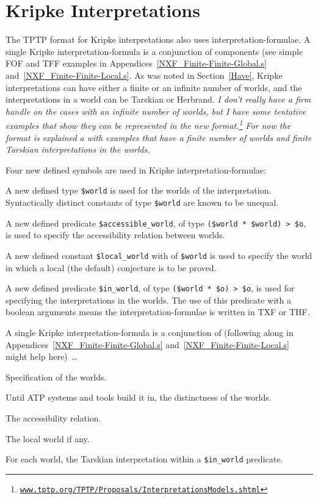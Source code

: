 \documentclass{easychair}
\newenvironment{packed_itemize}{
\vspace*{-0.3em}
\begin{itemize}
\setlength{\partopsep}{0pt}
\setlength{\itemsep}{1pt}
\setlength{\parskip}{0pt}
\setlength{\parsep}{0pt}
}{\end{itemize}}
\begin{document}
\section{Kripke Interpretations}
\label{NewKripke}
 
The TPTP format for Kripke interpretations also uses interpretation-formulae.
A single Kripke interpre\-tation-formula is a conjunction of components (see simple FOF and TFF 
examples in Appendices~\ref{NXF_Finite-Finite-Global.s} and~\ref{NXF_Finite-Finite-Local.s}.
As was noted in Section~\ref{Have}, Kripke interpretations can have either a finite or an
infinite number of worlds, and the interpretations in a world can be Tarskian or Herbrand.
{\em I don't really have a firm handle on the cases with an infinite number of worlds, but I 
have some tentative examples that show they can be represented in the new format.\footnote{%
\href{https://www.tptp.org/TPTP/Proposals/InterpretationsModels.shtml\#KripkeInfiniteFinite}{{\tt www.tptp.org/TPTP/Proposals/InterpretationsModels.shtml}}}
For now the format is explained a with examples that have a finite number of worlds and finite
Tarskian interpretations in the worlds.}

Four new defined symbols are used in Kripke interpretation-formulae:
\begin{packed_itemize}
\item A new defined type {\tt \$world} is used for the worlds of the interpretation.
      Syntactically distinct constants of type {\tt \$world} are known to be unequal. 
\item A new defined predicate {\tt \$accessible\_world}, of type {\tt (\$world * \$world) > \$o},
      is used to specify the accessibility relation between worlds.
\item A new defined constant {\tt \$local\_world} with of {\tt \$world} is used to specify the
      world in which a local (the default) conjecture is to be proved. 
\item A new defined predicate {\tt \$in\_world}, of type {\tt (\$world * \$o) > \$o}, is used for 
      specifying the interpretations in the worlds.
      The use of this predicate with a boolean arguments means the interpretation-formulae is
      written in TXF or THF.
\end{packed_itemize}

A single Kripke interpretation-formula is a conjunction of (following along in 
Appendices~\ref{NXF_Finite-Finite-Global.s} and~\ref{NXF_Finite-Finite-Local.s} might help 
here)~\ldots
\begin{packed_itemize}
\item Specification of the worlds.
\item Until ATP systems and tools build it in, the distinctness of the worlds.
\item The accessibility relation.
\item The local world if any.
\item For each world, the Tarskian interpretation within a {\tt \$in\_world} predicate.
\end{packed_itemize}
\end{document}
